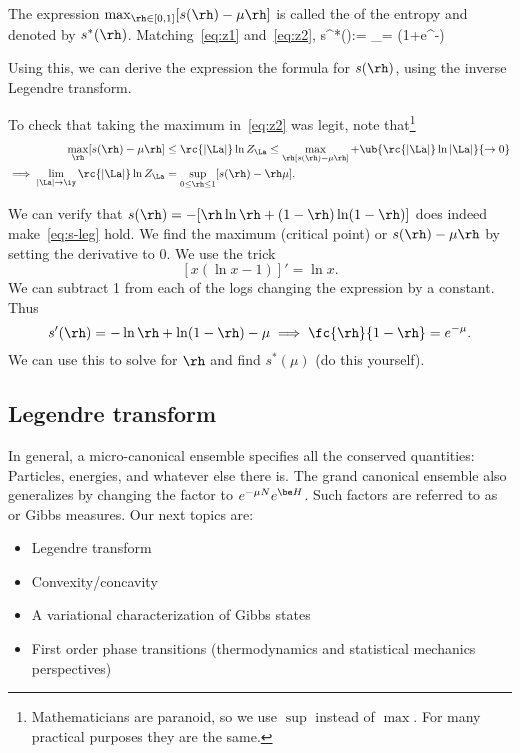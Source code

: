 The expression $\max_{\rh\in [0,1]}[s(\rh)-\mu\rh]$ is called the  of the entropy and denoted by $s^*(\rh)$. 
Matching~\eqref{eq:z1} and~\eqref{eq:z2},
s^*(\mu):= \max_\rh [s(\rh) - \mu\rh] = \ln (1+e^{-\mu})
\eeq


Using this, we can derive the expression the formula for $s(\rh)$, using the inverse Legendre transform.


To check that taking the maximum in~\eqref{eq:z2} was legit, note that\footnote{Mathematicians are paranoid, so we use $\sup$ instead of $\max$. For many practical purposes they are the same.}
\begin{align*}%
\max_{\rh}[s(\rh) - \mu \rh] &\le \rc{|\La|}\ln Z_{\La} \le \max_\rh [s(\rh)-\mu \rh] + \ub{\rc{|\La|}\ln |\La|}{\to 0}\\
\implies
\lim_{|\La|\to \iy} \rc{|\La|}\ln Z_{\La} &= \sup_{0\le \rh\le 1} [s(\rh) - \rh \mu].
\end{align*}


We can verify that  $s(\rh) = -[\rh\ln \rh +(1-\rh) \ln (1-\rh)]$
does indeed make~\eqref{eq:s-leg} hold. We find the maximum (critical point) or $s(\rh)-\mu \rh$ by setting the derivative to 0. %
We use the trick 
\[[x(\ln x-1)]'=\ln x.\] We can subtract 1 from each of the logs changing the expression by a constant. Thus
\[
s'(\rh) = -\ln \rh +\ln (1-\rh) - \mu \implies \fc{\rh}{1-\rh}=e^{-\mu}.
\]
We can use this to solve for $\rh$ and find $s^*(\mu)$ (do this yourself).

\subsection{Legendre transform}
In general, a micro-canonical ensemble specifies all the conserved quantities: Particles, energies, and whatever else there is. The grand canonical ensemble also generalizes by changing the factor to $e^{-\mu N} e^{\be H}$.
Such factors are referred to as  %
or Gibbs measures.
Our next topics are:
\begin{itemize}
\item
Legendre transform
\item
Convexity/concavity
\item A variational characterization of Gibbs states
\item First order phase transitions (thermodynamics and statistical mechanics perspectives)
\end{itemize}

